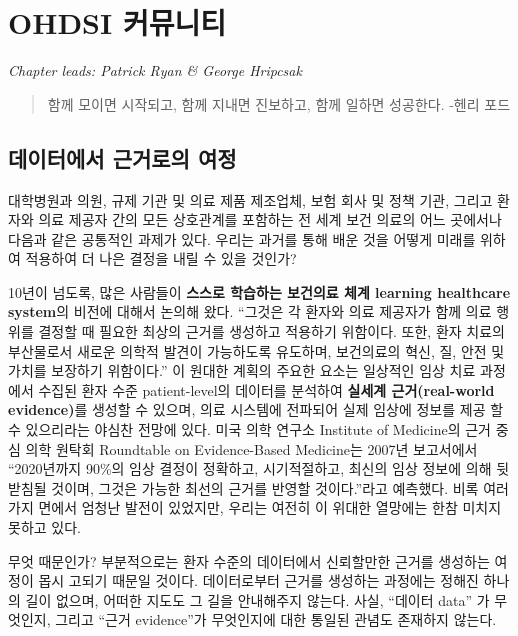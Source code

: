 \documentclass[11pt]{book}
\theoremstyle{definition}
\theoremstyle{definition}
\theoremstyle{definition}
\theoremstyle{remark}
\begin{document}
\chapter{OHDSI 커뮤니티}\label{OhdsiCommunity}

\emph{Chapter leads: Patrick Ryan \& George Hripcsak}

\begin{quote}
함께 모이면 시작되고, 함께 지내면 진보하고, 함께 일하면 성공한다. -헨리
포드
\end{quote}

\section{데이터에서 근거로의 여정}\label{--}

대학병원과 의원, 규제 기관 및 의료 제품 제조업체, 보험 회사 및 정책
기관, 그리고 환자와 의료 제공자 간의 모든 상호관계를 포함하는 전 세계
보건 의료의 어느 곳에서나 다음과 같은 공통적인 과제가 있다. 우리는
과거를 통해 배운 것을 어떻게 미래를 위하여 적용하여 더 나은 결정을 내릴
수 있을 것인가?

10년이 넘도록, 많은 사람들이 \textbf{스스로 학습하는 보건의료 체계
learning healthcare system}의 비전에 대해서 논의해 왔다. ``그것은 각
환자와 의료 제공자가 함께 의료 행위를 결정할 때 필요한 최상의 근거를
생성하고 적용하기 위함이다. 또한, 환자 치료의 부산물로서 새로운 의학적
발견이 가능하도록 유도하며, 보건의료의 혁신, 질, 안전 및 가치를 보장하기
위함이다.'' \citep{olsen2007learning} 이 원대한 계획의 주요한 요소는
일상적인 임상 치료 과정에서 수집된 환자 수준 patient-level의 데이터를
분석하여 \textbf{실세계 근거(real-world evidence)}를 생성할 수 있으며,
의료 시스템에 전파되어 실제 임상에 정보를 제공 할 수 있으리라는 야심찬
전망에 있다. 미국 의학 연구소 Institute of Medicine의 근거 중심 의학
원탁회 Roundtable on Evidence-Based Medicine는 2007년 보고서에서
``2020년까지 90\%의 임상 결정이 정확하고, 시기적절하고, 최신의 임상
정보에 의해 뒷받침될 것이며, 그것은 가능한 최선의 근거를 반영할
것이다.''라고 예측했다. \citep{olsen2007learning} 비록 여러 가지 면에서
엄청난 발전이 있었지만, 우리는 여전히 이 위대한 열망에는 한참 미치지
못하고 있다.

무엇 때문인가? 부분적으로는 환자 수준의 데이터에서 신뢰할만한 근거를
생성하는 여정이 몹시 고되기 때문일 것이다. 데이터로부터 근거를 생성하는
과정에는 정해진 하나의 길이 없으며, 어떠한 지도도 그 길을 안내해주지
않는다. 사실, ``데이터 data'' 가 무엇인지, 그리고 ``근거 evidence''가
무엇인지에 대한 통일된 관념도 존재하지 않는다.
\end{document}
